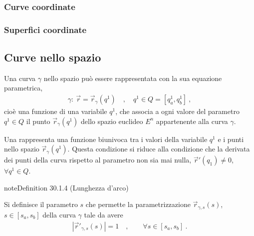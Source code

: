 \documentclass[letterpaper,10pt,italian]{jupyterBook}
\begin{document}
\subsubsection{Curve coordinate}
\label{\detokenize{ch/vector-calculus/geometry:curve-coordinate}}\label{\detokenize{ch/vector-calculus/geometry:vector-calculus-geometry-coordinate-lines}}

\subsubsection{Superfici coordinate}
\label{\detokenize{ch/vector-calculus/geometry:superfici-coordinate}}\label{\detokenize{ch/vector-calculus/geometry:vector-calculus-geometry-coordiante-sufraces}}

\subsection{Curve nello spazio}
\label{\detokenize{ch/vector-calculus/geometry:curve-nello-spazio}}\label{\detokenize{ch/vector-calculus/geometry:vector-calculus-geometry-lines}}
\sphinxAtStartPar
Una curva \(\gamma\) nello spazio può essere rappresentata con la sua equazione parametrica,
\begin{equation*}
\begin{split}\gamma: \ \vec{r} = \vec{r}_{\gamma}(q^1) \quad , \quad q^1 \in Q = [q^1_a, q^1_b] \ ,\end{split}
\end{equation*}
\sphinxAtStartPar
cioè una funzione di una variabile \(q^1\), che associa a ogni valore del parametro \(q^1 \in Q\) il punto \(\vec{r}_\gamma(q^1)\) dello spazio euclideo \(E^n\) appartenente alla curva \(\gamma\).

\sphinxAtStartPar
Una  rappresenta una funzione biunivoca tra i valori della variabile \(q^1\) e i punti nello spazio \(\vec{r}_{\gamma}(q^1)\). Questa condizione si riduce alla condizione che la derivata dei punti della curva rispetto al parametro non sia mai nulla, \(\vec{r}'(q_1) \ne 0\), \(\forall q^{1} \in Q\).
\label{ch/vector-calculus/geometry:arc-length}
\begin{sphinxadmonition}{note}{Definition 30.1.4 (Lunghezza d’arco)}



\sphinxAtStartPar
Si definisce  il parametro \(s\) che permette la parametrizzazione \(\vec{r}_{\gamma,s}(s)\), \(s \in [s_a, s_b]\) della curva \(\gamma\) tale da avere
\begin{equation*}
\begin{split}|\vec{r}'_{\gamma,s}(s)| = 1 \quad , \qquad \forall s \in [s_a, s_b] \ .\end{split}
\end{equation*}\end{sphinxadmonition}
\end{document}
